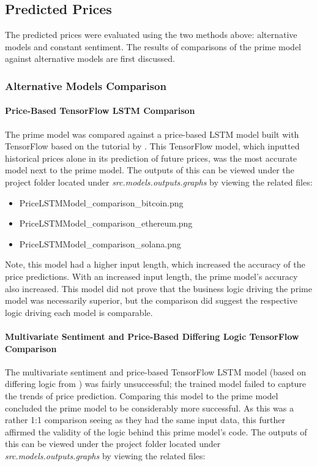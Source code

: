\documentclass[10pt,twocolumn]{article}
\begin{document}
\subsection{Predicted Prices}

The predicted prices were evaluated using the two methods above: alternative models and constant sentiment. The results of comparisons of the prime model against alternative models are first discussed.

\subsubsection{Alternative Models Comparison}

\paragraph{Price-Based TensorFlow LSTM Comparison}

The prime model was compared against a price-based LSTM model built with TensorFlow based on the tutorial by \textcite{PriceLSTMModel}. This TensorFlow model, which inputted historical prices alone in its prediction of future prices, was the most accurate model next to the prime model. The outputs of this can be viewed under the project folder located under \textit{src.models.outputs.graphs} by viewing the related files:

\begin{itemize}
    \item PriceLSTMModel\_comparison\_bitcoin.png
    \item PriceLSTMModel\_comparison\_ethereum.png
    \item PriceLSTMModel\_comparison\_solana.png
\end{itemize}

Note, this model had a higher input length, which increased the accuracy of the price predictions. With an increased input length, the prime model's accuracy also increased. This model did not prove that the business logic driving the prime model was necessarily superior, but the comparison did suggest the respective logic driving each model is comparable.

\paragraph{Multivariate Sentiment and Price-Based Differing Logic TensorFlow Comparison}

The multivariate sentiment and price-based TensorFlow LSTM model (based on differing logic from \textcite{SampleSentimentLSTMModel}) was fairly unsuccessful; the trained model failed to capture the trends of price prediction. Comparing this model to the prime model concluded the prime model to be considerably more successful. As this was a rather 1:1 comparison seeing as they had the same input data, this further affirmed the validity of the logic behind this prime model's code. The outputs of this can be viewed under the project folder located under \textit{src.models.outputs.graphs} by viewing the related files:
\end{document}
